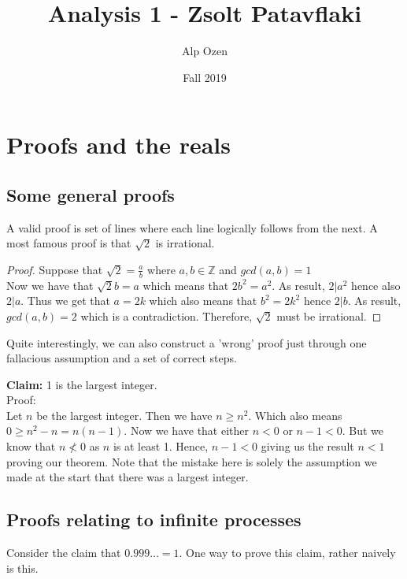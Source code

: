 \documentclass[titlepage]{article}
\title{\textbf{Analysis 1 - Zsolt Patavflaki}}
\author{Alp Ozen}
\date{Fall 2019}
\begin{document}
\maketitle
\tableofcontents
\clearpage
\section{Proofs and the reals}
\subsection{Some general proofs}
A valid proof is set of lines where each line logically follows from the next. 
A most famous proof is that $\sqrt{2} $ is irrational. 

\begin{tcolorbox}
\begin{proof}
	Suppose that $\sqrt{2} = \frac{a}{b}$ where $a,b \in \mathbb{Z}$ and $gcd(a,b) = 1$
	\\
	Now we have that $\sqrt{2}b = a$ which means that $2b^2 = a^2$.
	As result, $2 \vert a^2$ hence also $2 \vert a$. Thus we get that $a = 2k$ which also means that $b^2 = 2k^2$ hence $2 \vert b$. As result, $gcd(a,b) = 2$ which is a contradiction. Therefore, $\sqrt{2}$ must be irrational. 
	\end{proof}
\end{tcolorbox}

Quite interestingly, we can also construct a 'wrong' proof just through one fallacious assumption and a set of correct steps. 

\begin{tcolorbox}
    \textbf{Claim:} 1 is the largest integer.
    \\
    Proof: 
    \\
    Let $n$ be the largest integer. Then we have $n \geq n^2$. Which also means $0 \geq n^2 - n = n(n-1)$. Now we have that either $n < 0$ or $n - 1 < 0$. But we know that $ n \nless 0$ as $n$ is at least 1. Hence, $n - 1 < 0$ giving us the result $n < 1$ proving our theorem. Note that the mistake here is solely the assumption we made at the start that there was a largest integer. 
\end{tcolorbox}
\subsection{Proofs relating to infinite processes}
Consider the claim that $0.999\ldots = 1$.
One way to prove this claim, rather naively is this.
\end{document}
